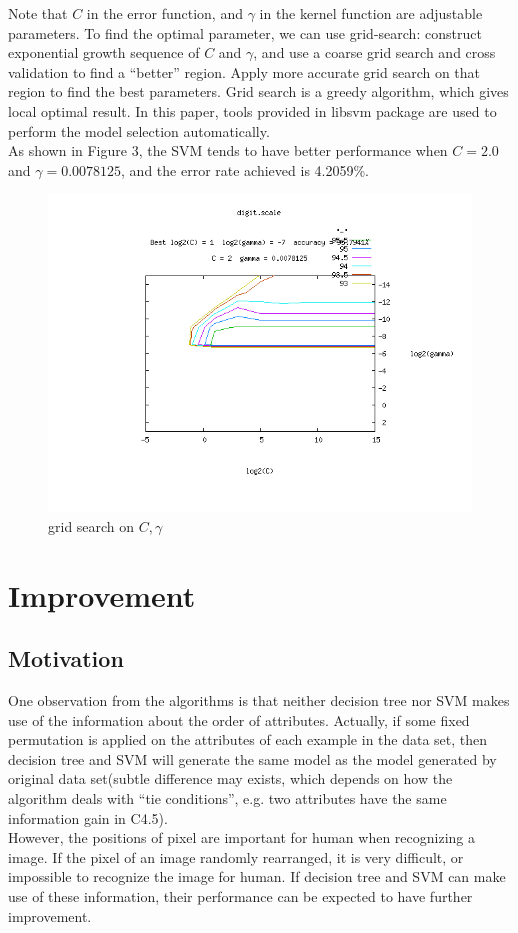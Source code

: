 \documentclass[a4paper,11pt]{article}
\begin{document}
Note that $C$ in the error function, and $\gamma$ in the kernel function are adjustable parameters. To find the optimal parameter, we can use grid-search\cite{SVM}: construct exponential growth sequence of $C$ and $\gamma$, and use a coarse grid search and cross validation to find a ``better'' region. Apply more accurate grid search on that region to find the best parameters. Grid search is a greedy algorithm, which gives local optimal result. In this paper, tools provided in libsvm\cite{LIBSVM} package are used to perform the model selection automatically.\\
As shown in Figure 3, the SVM tends to have better performance when $C=2.0$ and $\gamma=0.0078125$, and the error rate achieved is 4.2059\%.

\begin{figure}
\centering
\includegraphics[width=1.0\textwidth]{digit}
\caption{grid search on $C,\gamma$}
\end{figure}

\section{Improvement}
\subsection{Motivation}
One observation from the algorithms is that neither decision tree nor SVM makes use of the information about the order of attributes. Actually, if some fixed permutation is applied on the attributes of each example in the data set, then decision tree and SVM will generate the same model as the model generated by original data set(subtle difference may exists, which depends on how the algorithm deals with ``tie conditions'', e.g. two attributes have the same information gain in C4.5).\\
However, the positions of pixel are important for human when recognizing a image. If the pixel of an image randomly rearranged, it is very difficult, or impossible to recognize the image for human. If decision tree and SVM can make use of these information, their performance can be expected to have further improvement.\\
\end{document}
